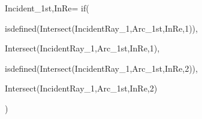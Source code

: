 Incident_{1st,InRe}=
  if(

    isdefined(Intersect(IncidentRay_{1},Arc_{1st,InRe},1)),

    Intersect(IncidentRay_{1},Arc_{1st,InRe},1),

    isdefined(Intersect(IncidentRay_{1},Arc_{1st,InRe},2)),

    Intersect(IncidentRay_{1},Arc_{1st,InRe},2)
    
  )
